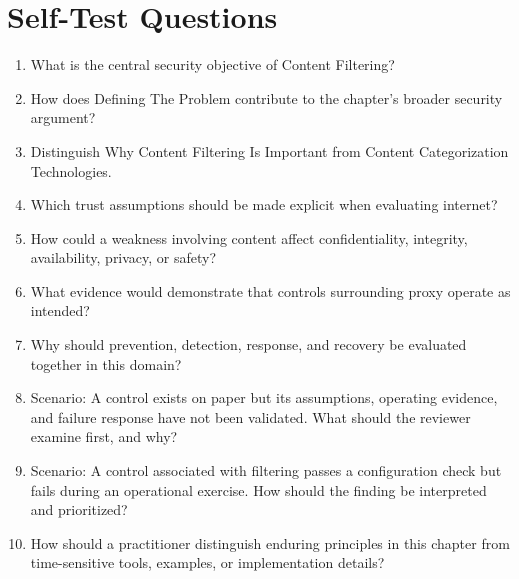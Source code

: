 \documentclass[11pt]{article}
\begin{document}
\section*{Self-Test Questions}
\begin{enumerate}
\item What is the central security objective of Content Filtering?
\item How does Defining The Problem contribute to the chapter's broader security argument?
\item Distinguish Why Content Filtering Is Important from Content Categorization Technologies.
\item Which trust assumptions should be made explicit when evaluating internet?
\item How could a weakness involving content affect confidentiality, integrity, availability, privacy, or safety?
\item What evidence would demonstrate that controls surrounding proxy operate as intended?
\item Why should prevention, detection, response, and recovery be evaluated together in this domain?
\item Scenario: A control exists on paper but its assumptions, operating evidence, and failure response have not been validated. What should the reviewer examine first, and why?
\item Scenario: A control associated with filtering passes a configuration check but fails during an operational exercise. How should the finding be interpreted and prioritized?
\item How should a practitioner distinguish enduring principles in this chapter from time-sensitive tools, examples, or implementation details?
\end{enumerate}
\end{document}
